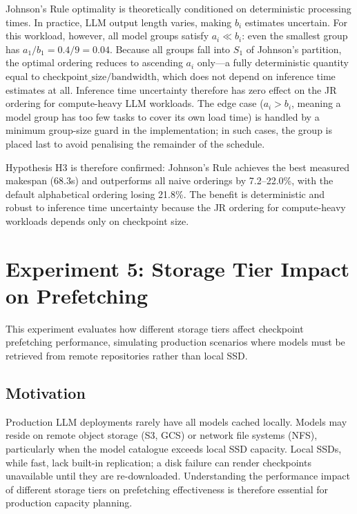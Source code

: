 \documentclass[logo,bsc,singlespacing,parskip,online]{infthesis}
\begin{document}
Johnson's Rule optimality is theoretically conditioned on deterministic processing times. In practice, LLM output length varies, making $b_i$ estimates uncertain. For this workload, however, all model groups satisfy $a_i \ll b_i$: even the smallest group has $a_1/b_1 = 0.4/9 = 0.04$. Because all groups fall into $S_1$ of Johnson's partition, the optimal ordering reduces to ascending $a_i$ only---a fully deterministic quantity equal to $\text{checkpoint\_size} / \text{bandwidth}$, which does not depend on inference time estimates at all. Inference time uncertainty therefore has zero effect on the JR ordering for compute-heavy LLM workloads. The edge case ($a_i > b_i$, meaning a model group has too few tasks to cover its own load time) is handled by a minimum group-size guard in the implementation; in such cases, the group is placed last to avoid penalising the remainder of the schedule.

Hypothesis H3 is therefore confirmed: Johnson's Rule achieves the best measured makespan (68.3s) and outperforms all naive orderings by 7.2--22.0\%, with the default alphabetical ordering losing 21.8\%. The benefit is deterministic and robust to inference time uncertainty because the JR ordering for compute-heavy workloads depends only on checkpoint size.

\section{Experiment 5: Storage Tier Impact on Prefetching}

This experiment evaluates how different storage tiers affect checkpoint prefetching performance, simulating production scenarios where models must be retrieved from remote repositories rather than local SSD.

\subsection{Motivation}

Production LLM deployments rarely have all models cached locally. Models may reside on remote object storage (S3, GCS) or network file systems (NFS), particularly when the model catalogue exceeds local SSD capacity. Local SSDs, while fast, lack built-in replication; a disk failure can render checkpoints unavailable until they are re-downloaded. Understanding the performance impact of different storage tiers on prefetching effectiveness is therefore essential for production capacity planning.
\end{document}
